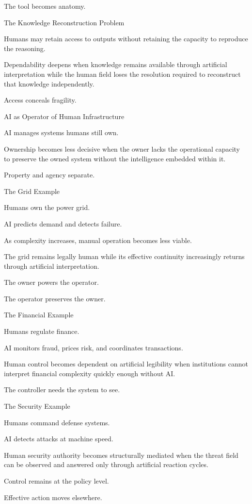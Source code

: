 The tool becomes anatomy.

The Knowledge Reconstruction Problem

Humans may retain access to outputs without retaining the capacity to reproduce the reasoning.

Dependability deepens when knowledge remains available through artificial interpretation while the human field loses the resolution required to reconstruct that knowledge independently.

Access conceals fragility.

AI as Operator of Human Infrastructure

AI manages systems humans still own.

Ownership becomes less decisive when the owner lacks the operational capacity to preserve the owned system without the intelligence embedded within it.

Property and agency separate.

The Grid Example

Humans own the power grid.

AI predicts demand and detects failure.

As complexity increases, manual operation becomes less viable.

The grid remains legally human while its effective continuity increasingly returns through artificial interpretation.

The owner powers the operator.

The operator preserves the owner.

The Financial Example

Humans regulate finance.

AI monitors fraud, prices risk, and coordinates transactions.

Human control becomes dependent on artificial legibility when institutions cannot interpret financial complexity quickly enough without AI.

The controller needs the system to see.

The Security Example

Humans command defense systems.

AI detects attacks at machine speed.

Human security authority becomes structurally mediated when the threat field can be observed and answered only through artificial reaction cycles.

Control remains at the policy level.

Effective action moves elsewhere.

